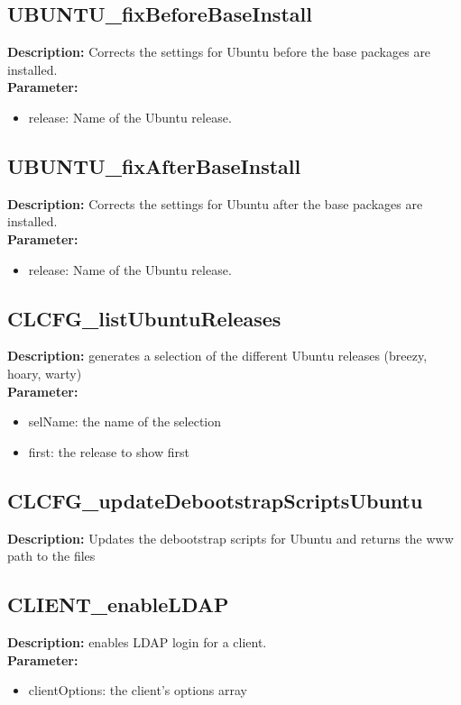 \subsection{UBUNTU\_fixBeforeBaseInstall}
\textbf{Description:} Corrects the settings for Ubuntu before the base packages are installed.\\
\textbf{Parameter:}
\begin{itemize}
\item release: Name of the Ubuntu release.
\end{itemize}

\subsection{UBUNTU\_fixAfterBaseInstall}
\textbf{Description:} Corrects the settings for Ubuntu after the base packages are installed.\\
\textbf{Parameter:}
\begin{itemize}
\item release: Name of the Ubuntu release.
\end{itemize}

\subsection{CLCFG\_listUbuntuReleases}
\textbf{Description:} generates a selection of the different Ubuntu releases (breezy, hoary, warty)\\
\textbf{Parameter:}
\begin{itemize}
\item selName: the name of the selection
\item first: the release to show first
\end{itemize}

\subsection{CLCFG\_updateDebootstrapScriptsUbuntu}
\textbf{Description:} Updates the debootstrap scripts for Ubuntu and returns the www path to the files\\

\subsection{CLIENT\_enableLDAP}
\textbf{Description:} enables LDAP login for a client.\\
\textbf{Parameter:}
\begin{itemize}
\item clientOptions: the client's options array
\end{itemize}

